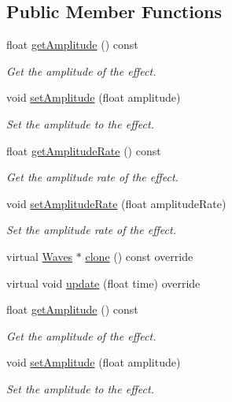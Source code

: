 \subsection*{Public Member Functions}
\begin{DoxyCompactItemize}
\item 
float \hyperlink{classWaves_a3934701be9e847dc8cfe87b501bc8463}{get\+Amplitude} () const
\begin{DoxyCompactList}\small\item\em Get the amplitude of the effect. \end{DoxyCompactList}\item 
void \hyperlink{classWaves_a65150f197db5932cdc1fc48fcec6fb4f}{set\+Amplitude} (float amplitude)
\begin{DoxyCompactList}\small\item\em Set the amplitude to the effect. \end{DoxyCompactList}\item 
float \hyperlink{classWaves_a5271ab00aa35799011e605b51949c8b7}{get\+Amplitude\+Rate} () const
\begin{DoxyCompactList}\small\item\em Get the amplitude rate of the effect. \end{DoxyCompactList}\item 
void \hyperlink{classWaves_abe89b564eea8d77f5e008218bcb48ccb}{set\+Amplitude\+Rate} (float amplitude\+Rate)
\begin{DoxyCompactList}\small\item\em Set the amplitude rate of the effect. \end{DoxyCompactList}\item 
virtual \hyperlink{classWaves}{Waves} $\ast$ \hyperlink{classWaves_a4d92fc4a2d0d52f24310b4b9df4ae547}{clone} () const override
\item 
virtual void \hyperlink{classWaves_aa08ec978ee072d46a94068504cc997e8}{update} (float time) override
\item 
float \hyperlink{classWaves_a3934701be9e847dc8cfe87b501bc8463}{get\+Amplitude} () const
\begin{DoxyCompactList}\small\item\em Get the amplitude of the effect. \end{DoxyCompactList}\item 
void \hyperlink{classWaves_a65150f197db5932cdc1fc48fcec6fb4f}{set\+Amplitude} (float amplitude)
\begin{DoxyCompactList}\small\item\em Set the amplitude to the effect. \end{DoxyCompactList}\item 

\end{DoxyCompactItemize}
